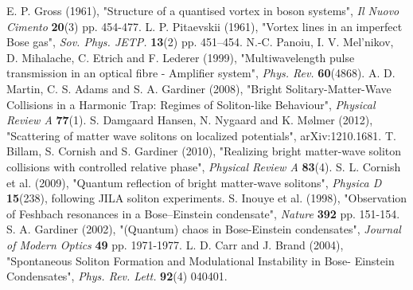 \documentclass[10pt, twocolumn]{revtex4}    %
\begin{document}
\begin{thebibliography}{}

 E. P. Gross (1961), "Structure of a quantised vortex in boson systems", \textit{Il Nuovo Cimento} 				\textbf{20}(3) pp. 454-477. 
  L. P. Pitaevskii (1961), "Vortex lines in an imperfect Bose gas", \textit{Sov. Phys. JETP.} \textbf{13}(2) 		pp. 451–454.
 N.-C. Panoiu, I. V. Mel’nikov, D. Mihalache, C. Etrich and F. Lederer (1999), "Multiwavelength pulse 			transmission in an optical fibre - Amplifier system", \textit{Phys. Rev.} \textbf{60}(4868). %
 A. D. Martin, C. S. Adams and S. A. Gardiner (2008), "Bright Solitary-Matter-Wave Collisions in a Harmonic 		Trap: Regimes of Soliton-like Behaviour", \textit{Physical Review A} \textbf{77}(1). %
 S. Damgaard Hansen, N. Nygaard and K. Mølmer (2012), "Scattering of matter wave solitons on 			localized potentials", arXiv:1210.1681. %
 T. Billam, S. Cornish and S. Gardiner (2010), "Realizing bright matter-wave soliton collisions with 				controlled relative phase", \textit{Physical Review A} \textbf{83}(4). %
 S. L. Cornish et al. (2009), "Quantum reflection of bright matter-wave solitons", \textit{Physica D} 			\textbf{15}(238), following JILA soliton experiments. 
 S. Inouye et al. (1998), "Observation of Feshbach resonances in a Bose–Einstein condensate", 				\textit{Nature} \textbf{392} pp. 151-154. 
 S. A. Gardiner (2002), "(Quantum) chaos in Bose-Einstein condensates", \textit{Journal of Modern Optics} 	\textbf{49} pp. 1971-1977.
 L. D. Carr and J. Brand (2004), "Spontaneous Soliton Formation and Modulational Instability in Bose-			Einstein Condensates", \textit{Phys. Rev. Lett.} \textbf{92}(4) 040401. %

\end{thebibliography} 


\end{document}
